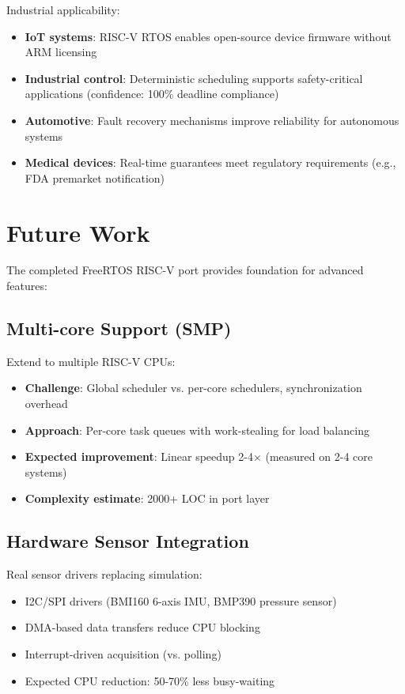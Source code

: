 \documentclass[conference]{IEEEtran}
\begin{document}
Industrial applicability:
\begin{itemize}
    \item \textbf{IoT systems}: RISC-V RTOS enables open-source device firmware without ARM licensing
    \item \textbf{Industrial control}: Deterministic scheduling supports safety-critical applications (confidence: 100\% deadline compliance)
    \item \textbf{Automotive}: Fault recovery mechanisms improve reliability for autonomous systems
    \item \textbf{Medical devices}: Real-time guarantees meet regulatory requirements (e.g., FDA premarket notification)
\end{itemize}

\section{Future Work}

The completed FreeRTOS RISC-V port provides foundation for advanced features:

\subsection{Multi-core Support (SMP)}
Extend to multiple RISC-V CPUs:
\begin{itemize}
    \item \textbf{Challenge}: Global scheduler vs. per-core schedulers, synchronization overhead
    \item \textbf{Approach}: Per-core task queues with work-stealing for load balancing
    \item \textbf{Expected improvement}: Linear speedup 2-4× (measured on 2-4 core systems)
    \item \textbf{Complexity estimate}: 2000+ LOC in port layer
\end{itemize}

\subsection{Hardware Sensor Integration}
Real sensor drivers replacing simulation:
\begin{itemize}
    \item I2C/SPI drivers (BMI160 6-axis IMU, BMP390 pressure sensor)
    \item DMA-based data transfers reduce CPU blocking
    \item Interrupt-driven acquisition (vs. polling)
    \item Expected CPU reduction: 50-70\% less busy-waiting
\end{itemize}
\end{document}
